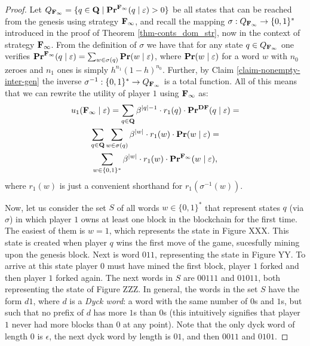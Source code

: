 \begin{proof}
Let $Q_{\rm {\bf F_\infty}} = \{q \in \mathbf{Q} \mid \mathbf{Pr}^{\rm {\bf F_\infty}}(q \mid \varepsilon) > 0\}$ be all states that can be reached from the genesis using strategy ${\rm {\bf F_\infty}}$, and recall 
the mapping $\sigma: Q_{\rm {\bf F_\infty}} \rightarrow \{0,1\}^*$ introduced  in the proof of Theorem \ref{thm-conts_dom_str}, now in the context of strategy ${\rm {\bf F_\infty}}$. From the definition of $\sigma$ we have that for any state $q \in Q_{\rm {\bf F_\infty}}$ one verifies 
$\mathbf{Pr}^{{\rm {\bf F_\infty}}}(q \mid \varepsilon) = \sum_{w \in \sigma(q)} \mathbf{Pr}(w \mid \varepsilon)$, where $\mathbf{Pr}(w \mid \varepsilon)$ for a word $w$ with $n_0$ zeroes and $n_1$ ones is simply 
$h^{n_1}(1-h)^{n_0}$. Further, by Claim \ref{claim-nonempty-inter-gen} the inverse  $\sigma^{-1}: \{0,1\}^* \rightarrow Q_{\rm {\bf F_\infty}}$ is a total function.  
All of this means that we can rewrite the utility of player $1$ using ${\rm {\bf F_\infty}}$ as: 
\begin{multline*}
u_1({\rm {\bf F_\infty}} \mid \varepsilon) = \sum_{q \in \mathbf{Q}} \beta^{|q|-1} \cdot  r_1(q) \cdot \mathbf{Pr}^{\text{\rm {\bf DF}}}(q \mid \varepsilon) = \\ 
\sum_{q \in \mathbf{Q}} \sum_{w \in \sigma(q)} \beta^{|w|} \cdot  r_1(w) \cdot \mathbf{Pr}(w \mid \varepsilon) =  \\
\sum_{w \in \{0,1\}^*} \beta^{|w|} \cdot  r_1(w) \cdot \mathbf{Pr}^{{\rm {\bf F_\infty}}}(w \mid \varepsilon),
\end{multline*}
where $r_1(w)$ is just a convenient shorthand for $r_1(\sigma^{-1}(w))$.






Now, let us consider the set $S$ of all words $w \in \{0,1\}^*$ that represent states $q$ (via $\sigma$) in which player $1$ owns at least one block in the blockchain for the first time. 
The easiest of them is $w = 1$, which represents the state in Figure XXX. This state is created when player $q$ wins the first move of the game, sucesfully mining upon the genesis block. Next is word $011$, representing the state in Figure YY. To arrive at this state player $0$ must have mined the first block, player $1$ forked and then player $1$ 
forked again. The next words in $S$ are $00111$ and $01011$, both representing the state of Figure ZZZ. 
In general, the words in the set $S$ have the form $d1$, where $d$ is a \emph{Dyck word}: a word with the same number of $0$s and $1$s, but such that 
no prefix of $d$ has more $1$s than $0$s (this intuitively signifies that player $1$ never had more blocks than $0$ at any point). 
Note that the only dyck word of length $0$ is $\epsilon$, the next dyck word by length is $01$, and then $0011$ and $0101$. 


\end{proof}
